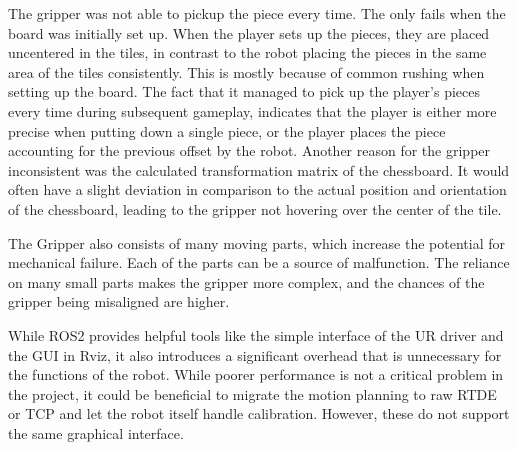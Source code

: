The gripper was not able to pickup the piece every time. The only fails when the board was initially set up. When the player sets up the pieces, they are placed uncentered in the tiles, in contrast to the robot placing the pieces in the same area of the tiles consistently. This is mostly because of common rushing when setting up the board. The fact that it managed to pick up the player's pieces every time during subsequent gameplay, indicates that the player is either more precise when putting down a single piece, or the player places the piece accounting for the previous offset by the robot. 
Another reason for the gripper inconsistent was the calculated transformation matrix of the chessboard. It would often have a slight deviation in comparison to the actual position and orientation of the chessboard, leading to the gripper not hovering over the center of the tile.

The Gripper also consists of many moving parts, which increase the potential for mechanical failure. Each of the parts can be a source of malfunction. The reliance on many small parts makes the gripper more complex, and the chances of the gripper being misaligned are higher. 

While ROS2 provides helpful tools like the simple interface of the UR driver and the GUI in Rviz, it also introduces a significant overhead that is unnecessary for the functions of the robot. While poorer performance is not a critical problem in the project, it could be beneficial to migrate the motion planning to raw RTDE or TCP and let the robot itself handle calibration. However, these do not support the same graphical interface.


